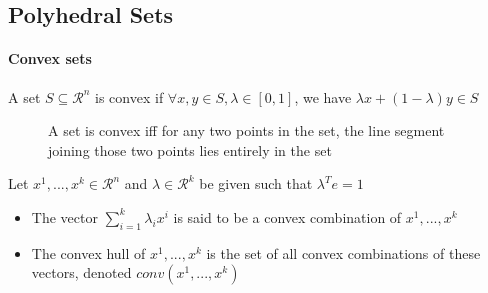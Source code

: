         \subsection{Polyhedral Sets}
            \paragraph{Convex sets}
                A set $S\subseteq \mathcal{R}^n$ is convex if $\forall x,y \in S, \lambda \in [0,1]$, we have $\lambda x + (1-\lambda)y \in S$

                \begin{figure}[!htp]
                    \centering
                    \caption{A set is convex iff for any two points in the set, the line segment joining those two points lies entirely in the set}
                \end{figure}

                Let $x^1, ..., x^k \in \mathcal{R}^n$ and $\lambda \in \mathcal{R}^k$ be given such that $\lambda^Te=1$
                \begin{itemize}
                    \item The vector $\sum_{i=1}^k \lambda_i x ^i$ is said to be a convex combination of $x^1, ... , x^k$
                    \item The convex hull of $x^1, ... , x^k$ is the set of all convex combinations of these vectors, denoted $conv(x^1, ... ,x^k)$
                \end{itemize}


